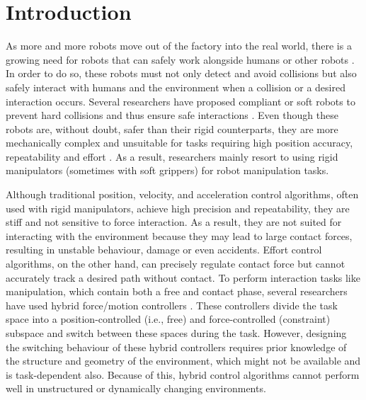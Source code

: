 \chapter{Introduction}
\label{chapter:introduction}

As more and more robots move out of the factory into the real world, there is a growing need for robots that can safely work alongside humans or other robots \cite{sharkawySurveyApplicationsHumanRobot2021,zacharakiSafetyBoundsHuman2020,suomalainenSurveyRobotManipulation2021}. In order to do so, these robots must not only detect and avoid collisions \cite{haddadinRobotCollisionsSurvey2017, zacharakiSafetyBoundsHuman2020} but also safely interact with humans and the environment when a collision or a desired interaction occurs. Several researchers have proposed compliant or soft robots to prevent hard collisions and thus ensure safe interactions \cite{hughesSoftManipulatorsGrippers2016,douSoftRoboticManipulators2021}. Even though these robots are, without doubt, safer than their rigid counterparts, they are more mechanically complex and unsuitable for tasks requiring high position accuracy, repeatability and effort \cite{douSoftRoboticManipulators2021}. As a result, researchers mainly resort to using rigid manipulators (sometimes with soft grippers) for robot manipulation tasks.

Although traditional position, velocity, and acceleration control algorithms, often used with rigid manipulators, achieve high precision and repeatability, they are stiff and not sensitive to force interaction. As a result, they are not suited for interacting with the environment because they may lead to large contact forces, resulting in unstable behaviour, damage or even accidents. Effort control algorithms, on the other hand, can precisely regulate contact force but cannot accurately track a desired path without contact. To perform interaction tasks like manipulation, which contain both a free and contact phase, several researchers have used hybrid force/motion controllers \cite{raibertHybridPositionForce1981,ortenziHybridMotionForce2017}. These controllers divide the task space into a position-controlled (i.e., free) and force-controlled (constraint) subspace and switch between these spaces during the task. However, designing the switching behaviour of these hybrid controllers requires prior knowledge of the structure and geometry of the environment, which might not be available and is task-dependent also. Because of this, hybrid control algorithms cannot perform well in unstructured or dynamically changing environments.

